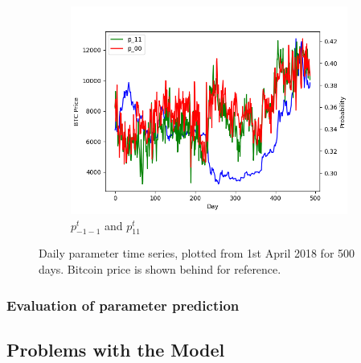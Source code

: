 \documentclass[a4paper,10pt]{article}
\begin{document}
\begin{figure}[h]
\begin{subfigure}[b]{0.4\textwidth}
    \end{subfigure}
    \begin{subfigure}[b]{0.4\textwidth}
        \includegraphics[width=\textwidth]{images/prob_params}
        \caption{$p_{-1-1}^t$ and $p_{11}^t$}
    \end{subfigure}
    \caption{Daily parameter time series, plotted from 1st April 2018 for 500 days. Bitcoin price is shown behind for reference.}
    \label{parameter_timeseries}
\end{figure}
\subsubsection{Evaluation of parameter prediction}
\subsection{Problems with the Model}
\end{document}
